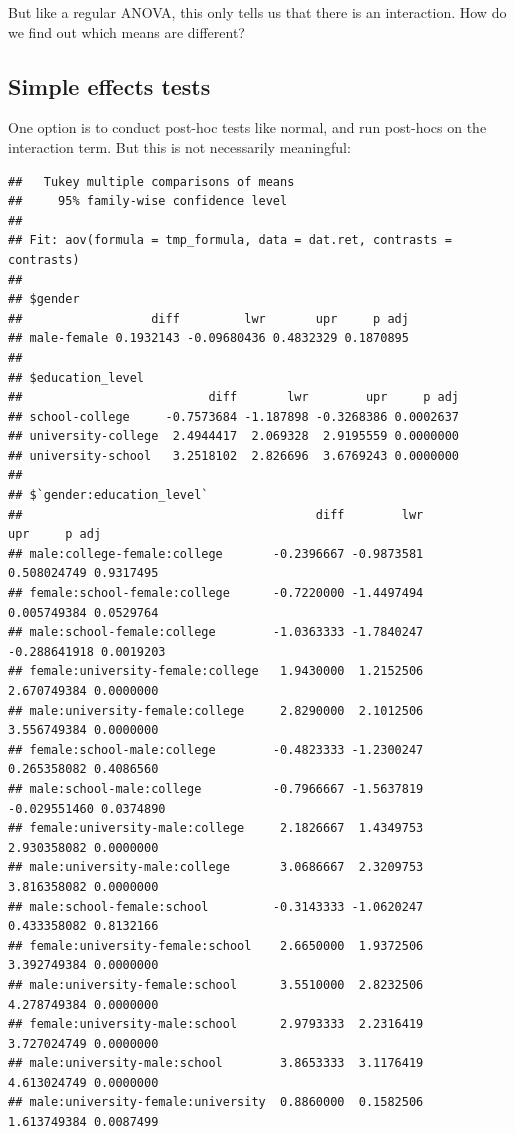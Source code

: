 \documentclass[
]{book}
\begin{document}
But like a regular ANOVA, this only tells us that there is an interaction. How do we find out which means are different?

\hypertarget{simple-effects-tests}{%
\subsection{Simple effects tests}\label{simple-effects-tests}}

One option is to conduct post-hoc tests like normal, and run post-hocs on the interaction term. But this is not necessarily meaningful:

\begin{verbatim}
##   Tukey multiple comparisons of means
##     95% family-wise confidence level
## 
## Fit: aov(formula = tmp_formula, data = dat.ret, contrasts = contrasts)
## 
## $gender
##                  diff         lwr       upr     p adj
## male-female 0.1932143 -0.09680436 0.4832329 0.1870895
## 
## $education_level
##                          diff       lwr        upr     p adj
## school-college     -0.7573684 -1.187898 -0.3268386 0.0002637
## university-college  2.4944417  2.069328  2.9195559 0.0000000
## university-school   3.2518102  2.826696  3.6769243 0.0000000
## 
## $`gender:education_level`
##                                         diff        lwr          upr     p adj
## male:college-female:college       -0.2396667 -0.9873581  0.508024749 0.9317495
## female:school-female:college      -0.7220000 -1.4497494  0.005749384 0.0529764
## male:school-female:college        -1.0363333 -1.7840247 -0.288641918 0.0019203
## female:university-female:college   1.9430000  1.2152506  2.670749384 0.0000000
## male:university-female:college     2.8290000  2.1012506  3.556749384 0.0000000
## female:school-male:college        -0.4823333 -1.2300247  0.265358082 0.4086560
## male:school-male:college          -0.7966667 -1.5637819 -0.029551460 0.0374890
## female:university-male:college     2.1826667  1.4349753  2.930358082 0.0000000
## male:university-male:college       3.0686667  2.3209753  3.816358082 0.0000000
## male:school-female:school         -0.3143333 -1.0620247  0.433358082 0.8132166
## female:university-female:school    2.6650000  1.9372506  3.392749384 0.0000000
## male:university-female:school      3.5510000  2.8232506  4.278749384 0.0000000
## female:university-male:school      2.9793333  2.2316419  3.727024749 0.0000000
## male:university-male:school        3.8653333  3.1176419  4.613024749 0.0000000
## male:university-female:university  0.8860000  0.1582506  1.613749384 0.0087499
\end{verbatim}
\end{document}
